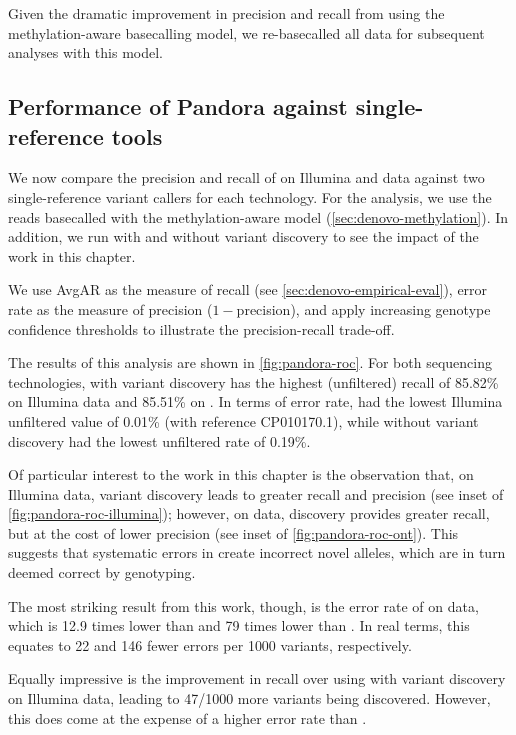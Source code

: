 \noindent
Given the dramatic improvement in precision and recall from using the methylation-aware basecalling model, we re-basecalled all data for subsequent analyses with this model.

\subsection{Performance of Pandora against single-reference tools}
\label{sec:pandora-roc-results}

We now compare the precision and recall of \pandora{} on Illumina and \ont{} data against two single-reference variant callers for each technology. For the \ont{} analysis, we use the reads basecalled with the methylation-aware model (\autoref{sec:denovo-methylation}). In addition, we run \pandora{} with and without \denovo{} variant discovery to see the impact of the work in this chapter.

We use AvgAR as the measure of recall (see \autoref{sec:denovo-empirical-eval}), error rate as the measure of precision ($1-$precision), and apply increasing genotype confidence thresholds to illustrate the precision-recall trade-off. 

The results of this analysis are shown in \autoref{fig:pandora-roc}. For both sequencing technologies, \pandora{} with \denovo{} variant discovery has the highest (unfiltered) recall of 85.82\% on Illumina data and 85.51\% on \ont{}. In terms of error rate,  had the lowest Illumina unfiltered value of 0.01\% (with reference CP010170.1), while \pandora{} without \denovo{} variant discovery had the lowest \ont{} unfiltered rate of 0.19\%. 

Of particular interest to the work in this chapter is the observation that, on Illumina data, \denovo{} variant discovery leads to greater recall and precision (see inset of \autoref{fig:pandora-roc-illumina}); however, on \ont{} data, \denovo{} discovery provides greater recall, but at the cost of lower precision (see inset of \autoref{fig:pandora-roc-ont}). This suggests that systematic errors in \ont{} create incorrect novel alleles, which are in turn deemed correct by genotyping.

The most striking result from this work, though, is the error rate of \pandora{} on \ont{} data, which is 12.9 times lower than  and 79 times lower than . In real terms, this equates to 22 and 146 fewer errors per 1000 variants, respectively.

Equally impressive is the improvement in recall over  using \pandora{} with variant discovery on Illumina data, leading to 47/1000 more variants being discovered. However, this does come at the expense of a higher error rate than .

